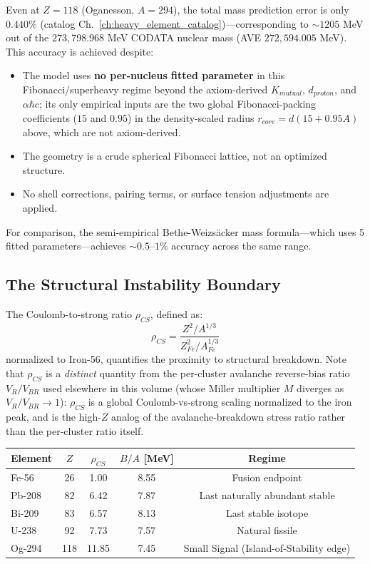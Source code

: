 Even at $Z = 118$ (Oganesson, $A = 294$), the total mass prediction error is only $0.440\%$ (catalog Ch.~\ref{ch:heavy_element_catalog})---corresponding to $\sim 1205$ MeV out of the $273{,}798.968$ MeV CODATA nuclear mass (AVE $272{,}594.005$ MeV). This accuracy is achieved despite:
\begin{itemize}
    \item The model uses \textbf{no per-nucleus fitted parameter} in this Fibonacci/superheavy regime beyond the axiom-derived $K_{mutual}$, $d_{proton}$, and $\alpha\hbar c$; its only empirical inputs are the two global Fibonacci-packing coefficients ($15$ and $0.95$) in the density-scaled radius $r_{core}=d(15+0.95A)$ above, which are not axiom-derived.
    \item The geometry is a crude spherical Fibonacci lattice, not an optimized structure.
    \item No shell corrections, pairing terms, or surface tension adjustments are applied.
\end{itemize}

For comparison, the semi-empirical Bethe-Weizs\"{a}cker mass formula---which uses 5 fitted parameters---achieves $\sim 0.5$--$1\%$ accuracy across the same range.

\subsection{The Structural Instability Boundary}

The Coulomb-to-strong ratio $\rho_{CS}$, defined as:
\begin{equation}
    \rho_{CS} = \frac{Z^2 / A^{1/3}}{Z_{Fe}^2 / A_{Fe}^{1/3}}
\end{equation}
normalized to Iron-56, quantifies the proximity to structural breakdown. Note that $\rho_{CS}$ is a \emph{distinct} quantity from the per-cluster avalanche reverse-bias ratio $V_R/V_{BR}$ used elsewhere in this volume (whose Miller multiplier $M$ diverges as $V_R/V_{BR} \to 1$): $\rho_{CS}$ is a global Coulomb-vs-strong scaling normalized to the iron peak, and is the high-$Z$ analog of the avalanche-breakdown stress ratio rather than the per-cluster ratio itself.

\begin{center}
\renewcommand{\arraystretch}{1.2}
\begin{tabular}{lcccc}
\toprule
\textbf{Element} & $Z$ & $\rho_{CS}$ & $B/A$ [MeV] & \textbf{Regime} \\
\midrule
Fe-56  & 26  & 1.00 & 8.55 & Fusion endpoint \\
Pb-208 & 82  & 6.42 & 7.87 & Last naturally abundant stable \\
Bi-209 & 83  & 6.57 & 8.13 & Last stable isotope \\
U-238  & 92  & 7.73 & 7.57 & Natural fissile \\
Og-294 & 118 & 11.85 & 7.45 & Small Signal (Island-of-Stability edge) \\
\bottomrule
\end{tabular}
\end{center}


